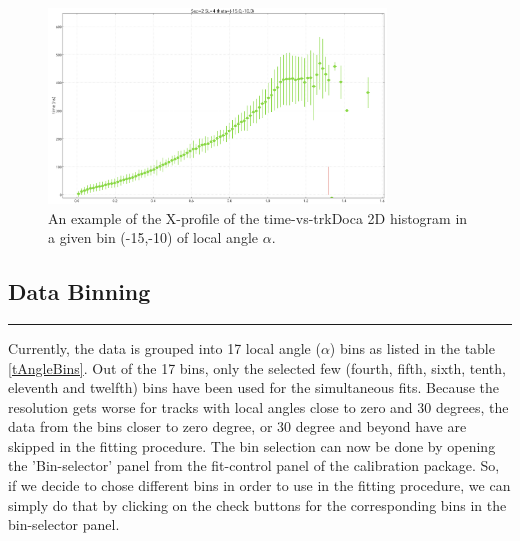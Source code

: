 \documentclass[12pt]{article}
\begin{document}
\begin{figure}
    \centering
    \includegraphics[width=0.8\textwidth]{Figures/time_vs_trkDocaXProfileExample_Sec2_SL4_th_m15_m10.png}
    \caption{An example of the X-profile of  the time-vs-trkDoca 2D histogram in a given bin (-15,-10) of local angle $\alpha$.}
    \label{fTimeVsTrkDocaXProfile}
\end{figure}

\newpage
\subsection{Data Binning}
{\color{black} \rule{\linewidth}{0.5mm} }

Currently, the data is grouped into 17 local angle ($\alpha$) bins as listed in the table \ref{tAngleBins}. Out of the 17 bins, only the selected few (fourth, fifth, sixth, tenth, eleventh and twelfth)  bins have been used for the simultaneous fits. Because the resolution gets worse for tracks with local angles close to zero and 30 degrees, the data from the bins closer to zero degree, or 30 degree and beyond have are skipped in the fitting procedure. The bin selection can now be done by opening the 'Bin-selector' panel from the fit-control panel of the calibration package. So, if we decide to chose different bins in order to use in the fitting procedure, we can simply do that by clicking on the check buttons for the corresponding bins in the bin-selector panel.
\end{document}
